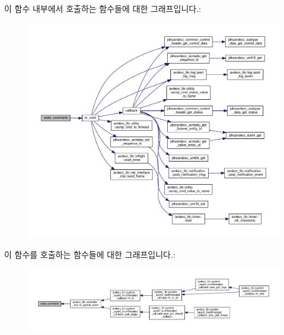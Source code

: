 이 함수 내부에서 호출하는 함수들에 대한 그래프입니다.\+:
\nopagebreak
\begin{figure}[H]
\begin{center}
\leavevmode
\includegraphics[width=350pt]{classavdecc__lib_1_1acmp__controller__state__machine_a96616c92d34da4a6859d5a653691e21b_cgraph}
\end{center}
\end{figure}




이 함수를 호출하는 함수들에 대한 그래프입니다.\+:
\nopagebreak
\begin{figure}[H]
\begin{center}
\leavevmode
\includegraphics[width=350pt]{classavdecc__lib_1_1acmp__controller__state__machine_a96616c92d34da4a6859d5a653691e21b_icgraph}
\end{center}
\end{figure}


